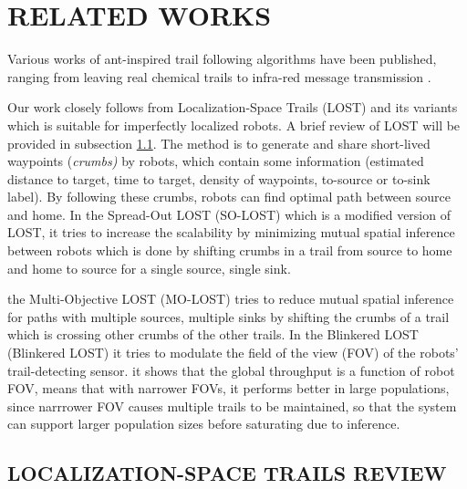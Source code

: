 \documentclass[letterpaper, 10 pt, conference]{ieeeconf}  %
\begin{document}
\section{RELATED WORKS}
Various works of ant-inspired trail following algorithms have been published, ranging from leaving real chemical trails \cite{Rus-
sell et al. (1994)} to infra-red message transmission \cite{Payton et al. (2001)}. 

Our work closely follows from Localization-Space Trails (LOST) \cite{LOST} and its variants which is suitable for imperfectly localized robots. A brief review of LOST will be provided in subsection \ref{ssection:LOST_review}. The method is to generate and share short-lived waypoints (\emph{crumbs)} by robots, which contain some information (estimated distance to target, time to target, density of waypoints, to-source or to-sink label). By following these crumbs, robots can find optimal path between source and home. In the Spread-Out LOST (SO-LOST) which is a modified version of LOST, it tries to increase the scalability by minimizing mutual spatial inference between robots which is done by shifting crumbs in a trail from source to home and home to source for a single source, single sink. 

the Multi-Objective LOST (MO-LOST) tries to reduce mutual spatial inference for paths with multiple sources, multiple sinks by shifting the crumbs of a trail which is crossing other crumbs of the other trails. In the Blinkered LOST (Blinkered LOST) it tries to modulate the field of the view (FOV) of the robots' trail-detecting sensor. it shows that the global throughput is a function of robot FOV, means that with narrower FOVs, it performs better in large populations, since narrrower FOV causes multiple trails to be maintained, so that the system can support larger population sizes before saturating due to inference.

\subsection{LOCALIZATION-SPACE TRAILS REVIEW} \label{ssection:LOST_review}
\end{document}

